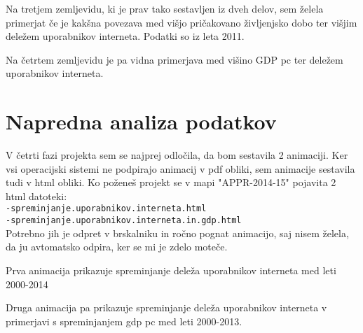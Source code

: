 \documentclass[11pt,a4paper]{article}
\begin{document}
\newpage

Na tretjem zemljevidu, ki je prav tako sestavljen iz dveh delov, sem  želela primerjat če je kakšna povezava med višjo pričakovano življenjsko dobo ter višjim deležem uporabnikov interneta. Podatki so iz leta 2011. \\

\begin{figure}[h!]
\begin{center}
  
  \end{center}
\end{figure}

\newpage
Na četrtem zemljevidu je pa vidna primerjava med višino GDP pc ter deležem uporabnikov interneta.

\begin{figure}[h!]
\begin{center}
  
  \end{center}
\end{figure}

\newpage
\section{Napredna analiza podatkov}
V četrti fazi projekta sem se najprej odločila, da bom sestavila 2 animaciji. Ker vsi operacijski sistemi ne podpirajo animacij v pdf obliki, sem animacije sestavila tudi v html obliki. Ko poženeš projekt se v mapi "APPR-2014-15" pojavita 2 html datoteki:
\\
\verb|-spreminjanje.uporabnikov.interneta.html|
\\
\verb|-spreminjanje.uporabnikov.interneta.in.gdp.html|
\\
Potrebno jih je odpret v brskalniku in ročno pognat animacijo, saj nisem želela, da ju avtomatsko odpira, ker se mi je zdelo moteče.
\newpage

Prva animacija prikazuje spreminjanje deleža uporabnikov interneta med leti 2000-2014
\begin{center}
\begin{figure}
\end{figure}

\end{center}

\newpage
Druga animacija pa prikazuje spreminjanje deleža uporabnikov interneta v primerjavi s spreminjanjem gdp pc med leti 2000-2013.
\begin{center}
\begin{figure}
\end{figure}

\end{center}
\end{document}
